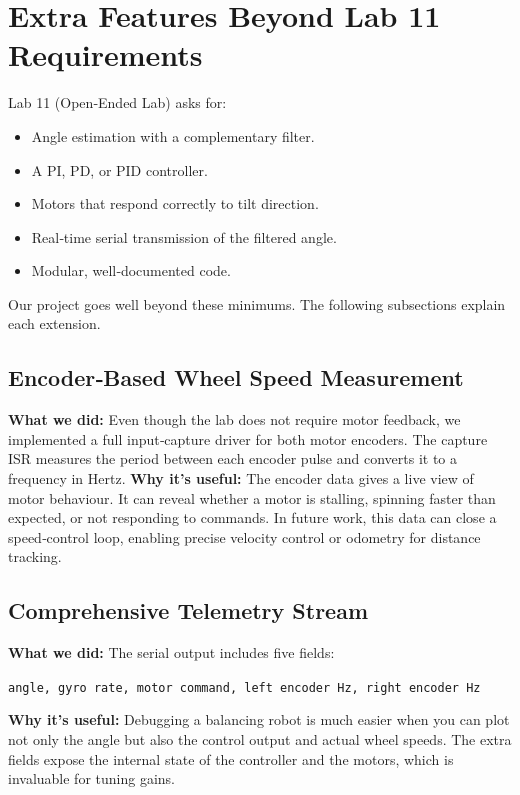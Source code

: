\documentclass[12pt,a4paper]{article}
\begin{document}
	\section{Extra Features Beyond Lab 11 Requirements}
	\label{sec:extra}
	
	Lab 11 (Open‑Ended Lab) asks for:
	\begin{itemize}
		\item Angle estimation with a complementary filter.
		\item A PI, PD, or PID controller.
		\item Motors that respond correctly to tilt direction.
		\item Real‑time serial transmission of the filtered angle.
		\item Modular, well‑documented code.
	\end{itemize}
	
	Our project goes well beyond these minimums. The following subsections explain each extension.
	
	\subsection{Encoder‑Based Wheel Speed Measurement}
	\textbf{What we did:} Even though the lab does not require motor feedback, we implemented a full input‑capture driver for both motor encoders. The capture ISR measures the period between each encoder pulse and converts it to a frequency in Hertz.  
	\textbf{Why it’s useful:} The encoder data gives a live view of motor behaviour. It can reveal whether a motor is stalling, spinning faster than expected, or not responding to commands. In future work, this data can close a speed‑control loop, enabling precise velocity control or odometry for distance tracking.
	
	\subsection{Comprehensive Telemetry Stream}
	\textbf{What we did:} The serial output includes five fields:
	\begin{center}
		\texttt{angle, gyro rate, motor command, left encoder Hz, right encoder Hz}
	\end{center}
	\textbf{Why it’s useful:} Debugging a balancing robot is much easier when you can plot not only the angle but also the control output and actual wheel speeds. The extra fields expose the internal state of the controller and the motors, which is invaluable for tuning gains.
	
\end{document}
